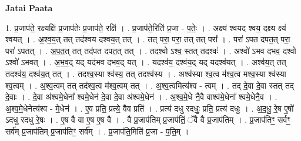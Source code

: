 \documentclass[17pt]{extarticle}
\begin{document}
\textbf{Jatai Paata} \newline

1. प्र॒जाप॑ते॒ रक्ष्यक्षि॑ प्र॒जाप॑तेः प्र॒जाप॑ते॒ रक्षि॑ । . प्र॒जाप॑ते॒रिति॑ प्र॒जा - प॒तेः॒ । . अक्ष्य॑ श्वयद श्वय॒ दक्ष्य क्ष्य॑ श्वयत् । . अ॒श्व॒य॒त् तत् तद॑श्वय दश्वय॒त् तत् । . तत् परा॒ परा॒ तत् तत् परा᳚ । . परा॑ ऽपत दपत॒त् परा॒ परा॑ ऽपतत् । . अ॒प॒त॒त् तत् तद॑पत दपत॒त् तत् । . तदश्वो ऽश्व॒ स्तत् तदश्वः॑ । . अश्वो॑ ऽभव दभव॒ दश्वो ऽश्वो॑ ऽभवत् । . अ॒भ॒व॒द् यद् यद॑भव दभव॒द् यत् । . यदश्व॑य॒ दश्व॑य॒द् यद् यदश्व॑यत् । . अश्व॑य॒त् तत् तदश्व॑य॒ दश्व॑य॒त् तत् । . तदश्व॒स्या श्व॑स्य॒ तत् तदश्व॑स्य । . अश्व॑स्या श्व॒त्व म॑श्व॒त्व मश्व॒स्या श्व॑स्या श्व॒त्वम् । . अ॒श्व॒त्वम् तत् तद॑श्व॒त्व म॑श्व॒त्वम् तत् । . अ॒श्व॒त्वमित्य॑श्व - त्वम् । . तद् दे॒वा दे॒वा स्तत् तद् दे॒वाः । . दे॒वा अ॑श्वमे॒धेना᳚ श्वमे॒धेन॑ दे॒वा दे॒वा अ॑श्वमे॒धेन॑ । . अ॒श्व॒मे॒धे नै॒वै वाश्व॑मे॒धेना᳚ श्वमे॒धेनै॒व । . अ॒श्व॒मे॒धेनेत्य॑श्व - मे॒धेन॑ । . ए॒व प्रति॒ प्रत्ये॒ वैव प्रति॑ । . प्रत्य॑ दधु रदधुः॒ प्रति॒ प्रत्य॑ दधुः । . अ॒द॒धु॒ रे॒ष ए॒षो॑ ऽदधु रदधु रे॒षः । . ए॒ष वै वा ए॒ष ए॒ष वै । . वै प्र॒जाप॑तिम् प्र॒जाप॑तिं॒ ॅवै वै प्र॒जाप॑तिम् । . प्र॒जाप॑तिꣳ॒॒ सर्वꣳ॒॒ सर्व॑म् प्र॒जाप॑तिम् प्र॒जाप॑तिꣳ॒॒ सर्व᳚म् । . प्र॒जाप॑ति॒मिति॑ प्र॒जा - प॒ति॒म् । \newline
\end{document}
